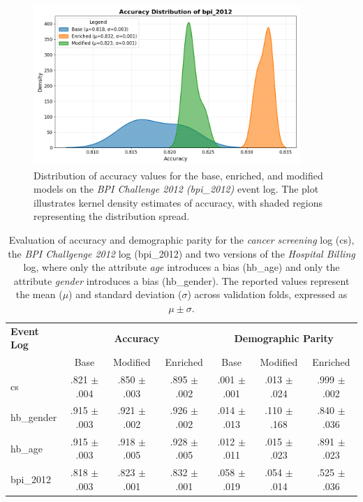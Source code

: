 \begin{figure}[h!]
    \centering
    \includegraphics[width=0.9\textwidth]{gfx/bpi_2012_accuracy.png}
    \caption{Distribution of accuracy values for the base, enriched,
    and modified models on the \textit{BPI Challenge 2012 (bpi\_2012)} event log.
    The plot illustrates kernel density estimates of accuracy, with shaded regions representing the distribution spread.}
    \label{fig:bpi_accuracy}
\end{figure}

\begin{table}[h!]
    \centering
    \scriptsize
    \renewcommand{\arraystretch}{1.2}
    \setlength{\tabcolsep}{6pt}
    \begin{tabularx}{\textwidth}{>{\centering\arraybackslash}m{1.7cm} | ccc | ccc}
        \toprule
        \textbf{Event Log} & \multicolumn{3}{c|}{\textbf{Accuracy}} & \multicolumn{3}{c}{\textbf{Demographic Parity}} \\
        & Base & Modified & Enriched & Base & Modified & Enriched \\
        \midrule
        cs &  .821 $\pm$ .004 &  .850 $\pm$ .003 &  .895 $\pm$ .002 &  .001 $\pm$ .001 &  .013 $\pm$ .024 &  .999 $\pm$ .002 \\
        hb\_gender &  .915 $\pm$ .003 &  .921 $\pm$ .002 &  .926 $\pm$ .002 &  .014 $\pm$ .013 &  .110 $\pm$ .168 &  .840 $\pm$ .036 \\
        hb\_age &  .915 $\pm$ .003 &  .918 $\pm$ .005 &  .928 $\pm$ .005 &  .012 $\pm$ .011 &  .015 $\pm$ .023 &  .891 $\pm$ .023 \\
        bpi\_2012 &  .818 $\pm$ .003 &  .823 $\pm$ .001 &  .832 $\pm$ .001 &  .058 $\pm$ .019 &  .054 $\pm$ .014 &  .525 $\pm$ .036 \\
        \bottomrule
    \end{tabularx}
    \vspace{0.2cm} %
    \caption{Evaluation of accuracy and demographic parity for the \textit{cancer screening} log (cs),
    the \textit{BPI Challgenge 2012} log (bpi\_2012) and two versions of the \textit{Hospital Billing} log,
    where only the attribute \textit{age} introduces a bias (hb\_age) and only the attribute \textit{gender} introduces a bias (hb\_gender).
    The reported values represent the mean ($\mu$) and standard deviation ($\sigma$) across validation folds, expressed as $\mu \pm \sigma$.
    }
    \label{tab:evaluation_results}
\end{table}

